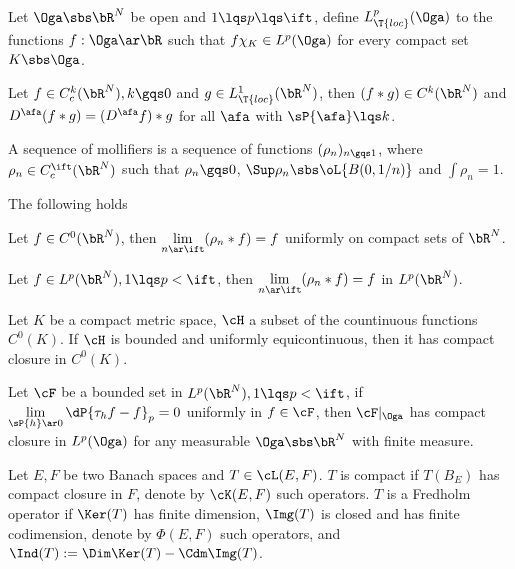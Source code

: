 \documentclass[article, a4paper, twoside]{universal}
\begin{document}
\begin{dfn}
    Let $\Oga\sbs\bR^{N}$ be open and $1\lqs p\lqs \ift$, define $L_{\T{loc}}^{p}(\Oga)$ to the functions $f:\Oga\ar\bR$ such that $f\chi_{K}\in L^{p}(\Oga)$ for every compact set $K\sbs\Oga$.
\end{dfn}

\begin{thm}[Proposition~4.20]
    Let $f\in C_{c}^{k}(\bR^{N}), k\gqs0$ and $g\in L_{\T{loc}}^{1}(\bR^{N})$, then $(f\ast g)\in C^{k}(\bR^{N})$ and $D^{\afa}(f\ast g)=(D^{\afa}f)\ast g$ for all $\afa$ with $\sP{\afa}\lqs k$.
\end{thm}


\begin{dfn}
    A sequence of mollifiers is a sequence of functions $(\rho_{n})_{n\gqs1}$, where $\rho_{n}\in C_{c}^{\ift}(\bR^{N})$ such that $\rho_{n}\gqs0$, $\Sup\rho_{n}\sbs\oL{B(0,1/n)}$ and $\int\rho_{n}=1$.
\end{dfn}

\begin{thm}
    The following holds
    \begin{itm}
        \item Let $f\in C^{0}(\bR^{N})$, then $\lim\limits_{n\ar\ift}(\rho_{n}\ast f)=f$ uniformly on compact sets of $\bR^{N}$.
        \item Let $f\in L^{p}(\bR^{N}), 1\lqs p<\ift$, then $\lim\limits_{n\ar\ift}(\rho_{n}\ast f)=f$ in $L^{p}(\bR^{N})$.
    \end{itm}
\end{thm}


\begin{thm}
    Let $K$ be a compact metric space, $\cH$ a subset of the countinuous functions $C^{0}(K)$. If $\cH$ is bounded and uniformly equicontinuous, then it has compact closure in $C^{0}(K)$.
\end{thm}


\begin{thm}
    Let $\cF$ be a bounded set in $L^{p}(\bR^{N}),1\lqs p<\ift$, if $\lim\limits_{\sP{h}\ar0}\dP{\tau_{h}f-f}_{p}=0$ uniformly in $f\in \cF$, then $\cF|_{\Oga}$ has compact closure in $L^{p}(\Oga)$ for any measurable $\Oga\sbs\bR^{N}$ with finite measure.
\end{thm}

\begin{dfn}
    Let $E,F$ be two Banach spaces and $T\in\cL(E,F)$. $T$ is compact if $T(B_{E})$ has compact closure in $F$, denote by $\cK(E,F)$ such operators. $T$ is a Fredholm operator if $\Ker(T)$ has finite dimension, $\Img(T)$ is closed and has finite codimension, denote by $\Phi(E,F)$ such operators, and $\Ind(T):=\Dim\Ker(T)-\Cdm\Img(T)$.
\end{dfn}
\end{document}
